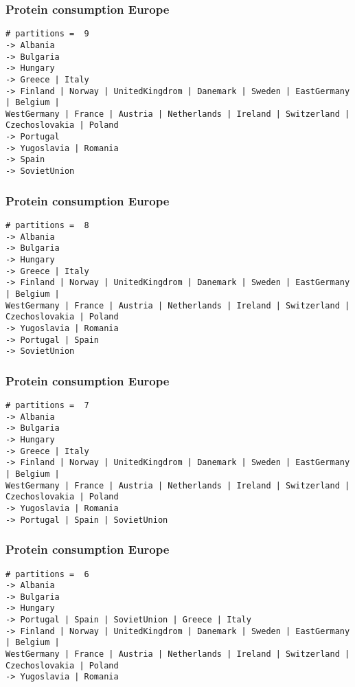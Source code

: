\begin{frame}[fragile, t]
\frametitle{Protein consumption Europe \hyperlink{last-aliments<1>}{}}
\scriptsize
\begin{verbatim}
# partitions =  9
-> Albania
-> Bulgaria
-> Hungary
-> Greece | Italy
-> Finland | Norway | UnitedKingdrom | Danemark | Sweden | EastGermany | Belgium | 
WestGermany | France | Austria | Netherlands | Ireland | Switzerland | 
Czechoslovakia | Poland
-> Portugal
-> Yugoslavia | Romania
-> Spain
-> SovietUnion
\end{verbatim}

\end{frame}
\begin{frame}[fragile, t]
\frametitle{Protein consumption Europe \hyperlink{last-aliments<1>}{}}
\scriptsize
\begin{verbatim}
# partitions =  8
-> Albania
-> Bulgaria
-> Hungary
-> Greece | Italy
-> Finland | Norway | UnitedKingdrom | Danemark | Sweden | EastGermany | Belgium | 
WestGermany | France | Austria | Netherlands | Ireland | Switzerland | 
Czechoslovakia | Poland
-> Yugoslavia | Romania
-> Portugal | Spain
-> SovietUnion
\end{verbatim}

\end{frame}
\begin{frame}[fragile, t]
\frametitle{Protein consumption Europe \hyperlink{last-aliments<1>}{}}
\scriptsize
\begin{verbatim}
# partitions =  7
-> Albania
-> Bulgaria
-> Hungary
-> Greece | Italy
-> Finland | Norway | UnitedKingdrom | Danemark | Sweden | EastGermany | Belgium | 
WestGermany | France | Austria | Netherlands | Ireland | Switzerland | 
Czechoslovakia | Poland
-> Yugoslavia | Romania
-> Portugal | Spain | SovietUnion
\end{verbatim}

\end{frame}
\begin{frame}[fragile, t]
\frametitle{Protein consumption Europe \hyperlink{last-aliments<1>}{}}
\scriptsize
\begin{verbatim}
# partitions =  6
-> Albania
-> Bulgaria
-> Hungary
-> Portugal | Spain | SovietUnion | Greece | Italy
-> Finland | Norway | UnitedKingdrom | Danemark | Sweden | EastGermany | Belgium | 
WestGermany | France | Austria | Netherlands | Ireland | Switzerland | 
Czechoslovakia | Poland
-> Yugoslavia | Romania
\end{verbatim}

\end{frame}
